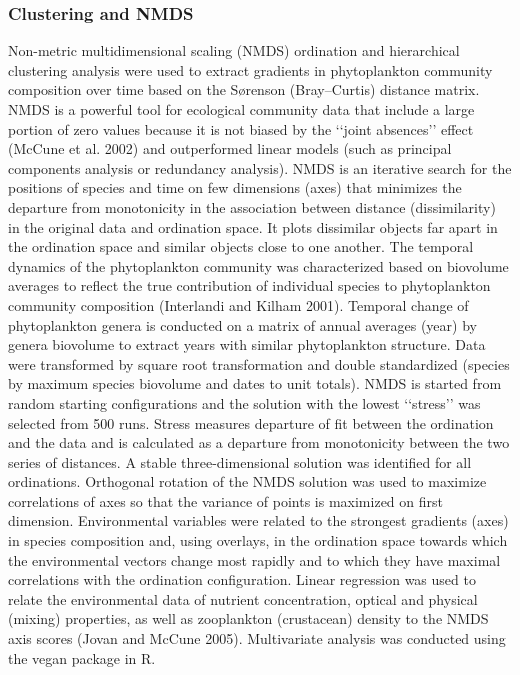 \documentclass[draft]{agujournal2019}
\begin{document}
    
        
    \subsubsection{Clustering and NMDS}
    Non-metric multidimensional scaling (NMDS) ordination and hierarchical clustering analysis were used to extract gradients in phytoplankton community composition over time based on the Sørenson (Bray–Curtis) distance matrix. NMDS is a powerful tool for ecological community data that include a large portion of zero values because it is not biased by the ‘‘joint absences’’ effect (McCune et al. 2002) and outperformed linear models (such as principal components analysis or redundancy analysis). NMDS is an iterative search for the positions of species and time on few dimensions (axes) that minimizes the departure from monotonicity in the association between distance (dissimilarity) in the original data and ordination space. It plots dissimilar objects far apart in the ordination space and similar objects close to one another. The temporal dynamics of the phytoplankton community was characterized based on biovolume averages to reflect the true contribution of individual species to phytoplankton community composition (Interlandi and Kilham 2001). Temporal change of phytoplankton genera is conducted on a matrix of annual averages (year) by genera biovolume to extract years with similar phytoplankton structure. Data were transformed by square root transformation and double standardized (species by maximum species biovolume and dates to unit totals). NMDS is started from random starting configurations and the solution with the lowest ‘‘stress’’ was selected from 500 runs. Stress measures departure of fit between the ordination and the data and is calculated as a departure from monotonicity between the two series of distances. A stable three-dimensional solution was identified for all ordinations. Orthogonal rotation of the NMDS solution was used to maximize correlations of axes so that the variance of points is maximized on first dimension. Environmental variables were related to the strongest gradients (axes) in species composition and, using overlays, in the ordination space towards which the environmental vectors change most rapidly and to which they have maximal correlations with the ordination configuration. Linear regression was used to relate the environmental data of nutrient concentration, optical and physical (mixing) properties, as well as zooplankton (crustacean) density to the NMDS axis scores (Jovan and McCune 2005). Multivariate analysis was conducted using the vegan package in R.
        
\end{document}

